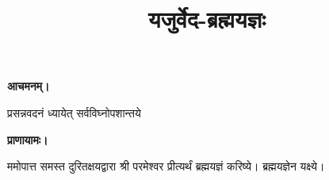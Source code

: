 \setmainfont[Script=Devanagari,Mapping=tex-text,Mapping=devanagarinumerals,AutoFakeBold=2.0]{Siddhanta}
\title{\Huge यजुर्वेद-ब्रह्मयज्ञः}
\date{}
\maketitle
\clearemptydoublepage
{}


\textbf{आचमनम्।}

{प्रसन्नवदनं ध्यायेत् सर्वविघ्नोपशान्तये}

\textbf{प्राणायामः।}

ममोपात्त समस्त दुरितक्षयद्वारा श्री परमेश्वर प्रीत्यर्थं ब्रह्मयज्ञं करिष्ये। ब्रह्मयज्ञेन यक्ष्ये।


